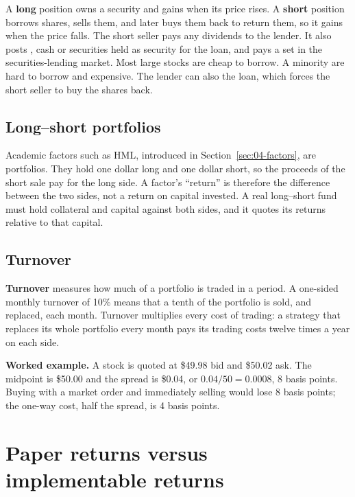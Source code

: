 A \textbf{long} position owns a security and gains when its price rises. A \textbf{short} position borrows shares, sells them, and later buys them back to return them, so it gains when the price falls. The short seller pays any dividends to the lender. It also posts , cash or securities held as security for the loan, and pays a  set in the securities-lending market. Most large stocks are cheap to borrow. A minority are hard to borrow and expensive. The lender can also  the loan, which forces the short seller to buy the shares back.

\subsection{Long--short portfolios}

Academic factors such as HML, introduced in Section~\ref{sec:04-factors}, are  portfolios. They hold one dollar long and one dollar short, so the proceeds of the short sale pay for the long side. A factor's ``return'' is therefore the difference between the two sides, not a return on capital invested. A real long--short fund must hold collateral and capital against both sides, and it quotes its returns relative to that capital.

\subsection{Turnover}

\textbf{Turnover} measures how much of a portfolio is traded in a period. A one-sided monthly turnover of 10\% means that a tenth of the portfolio is sold, and replaced, each month. Turnover multiplies every cost of trading: a strategy that replaces its whole portfolio every month pays its trading costs twelve times a year on each side.

\textbf{Worked example.} A stock is quoted at \$49.98 bid and \$50.02 ask. The midpoint is \$50.00 and the spread is \$0.04, or $0.04/50 = 0.0008$, 8 basis points. Buying with a market order and immediately selling would lose 8 basis points; the one-way cost, half the spread, is 4 basis points.


\section{Paper returns versus implementable returns}
\label{sec:17-paper}

